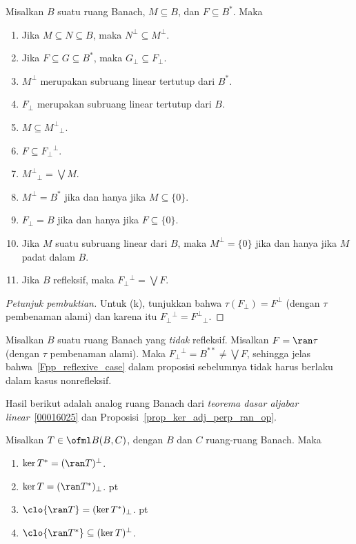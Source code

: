 \begin{prop}[Anihilator]  Misalkan $B$ suatu ruang Banach, $M \subseteq B$, dan $F \subseteq B^*$. Maka
 \begin{enumerate}[label=\rm{(\alph*)}]
  \item Jika $M \subseteq N \subseteq B$, maka $N^\perp \subseteq M^\perp$.
  \item Jika $F \subseteq G \subseteq B^*$, maka $G_\perp \subseteq F_\perp$.
  \item $M^\perp$ merupakan subruang linear tertutup dari $B^*$.
  \item $F_\perp$ merupakan subruang linear tertutup dari $B$.
  \item $M \subseteq M^\perp{}_\perp$.
  \item $F \subseteq F_\perp{}^\perp$.
  \item $M^\perp{}_\perp = \bigvee M$.
  \item $M^\perp = B^*$ jika dan hanya jika $M \subseteq \{0\}$.
  \item $F_\perp = B$ jika dan hanya jika $F \subseteq \{0\}$.
  \item Jika $M$ suatu subruang linear dari $B$, maka $M^\perp = \{0\}$ jika dan hanya jika $M$
padat dalam $B$.
  \item\label{Fpp_reflexive_case} Jika $B$ refleksif, maka $F_\perp{}^\perp = \bigvee F$.
 \end{enumerate}
\end{prop}

\begin{proof}[\emph{Petunjuk pembuktian}] Untuk (k), tunjukkan bahwa $\tau(F_\perp) = F^\perp$ (dengan $\tau$
pembenaman alami) dan karena itu $F_\perp{}^\perp = F^\perp{}_\perp$.  \ns
\end{proof}

\begin{exam} Misalkan $B$ suatu ruang Banach yang \emph{tidak} refleksif.  Misalkan $F = \ran \tau$ (dengan $\tau$
pembenaman alami).  Maka $F_\perp{}^\perp = B^{**} \ne \bigvee F$, sehingga jelas bahwa~\ref{Fpp_reflexive_case}
dalam proposisi sebelumnya tidak harus berlaku dalam kasus nonrefleksif.
\end{exam}

Hasil berikut adalah analog ruang Banach dari \emph{teorema dasar aljabar linear}~\ref{00016025} dan
Proposisi~\ref{prop_ker_adj_perp_ran_op}.

\begin{prop}\label{prop_FTLA_Bsp} Misalkan $T \in \ofml B(B,C)$, dengan $B$ dan $C$ ruang-ruang Banach. Maka
 \begin{enumerate}[label=\rm{(\alph*)}]
  \item $\ker T^\ast = (\ran T)^\perp$.
  \item $\ker T = (\ran T^*)_\perp$.
 pt
  \item $\clo{\ran T} = (\ker T^*)_\perp$.
 pt
  \item $\clo{\ran T^*} \subseteq (\ker T)^\perp$.
 \end{enumerate}
\end{prop}

